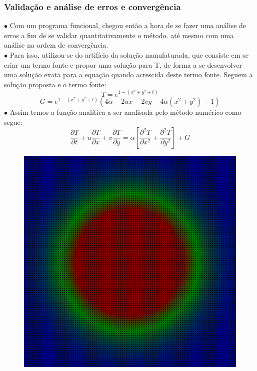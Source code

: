 \documentclass[xcolor=dvipsnames,10pt,aspectratio=169]{beamer}
\begin{document}
	\begin{frame}
		\frametitle{Validação e análise de erros e convergência}
		\begin{minipage}[h!]{0.77\textwidth}
			$\bullet$ Com um programa funcional, chegou então a hora de se fazer uma análise de erros a fim de se validar quantitativamente o método. até mesmo com uma análise na ordem de convergência.  \\
			$\bullet$ Para isso, utilizou-se do artifício da solução manufaturada, que consiste em se criar um termo fonte e propor uma solução para T, de forma a se desenvolver uma solução exata para a equação quando acrescida deste termo fonte. Seguem a solução proposta e o termo fonte:
			\begin{equation}
				T = e ^{1 - (x^2 + y^2 + t)}
			\end{equation}
			\begin{equation}
				G = e^{1 - (x^2 + y^2 + t)} \left( 4 \alpha - 2 u x - 2 v y - 4 \alpha (x^2 + y^2) - 1 \right)
			\end{equation}
			$\bullet$ Assim temos a função analítica a ser analisada pelo método numérico como segue:
			\begin{equation}
				\frac{\partial T}{\partial t} + u \frac{\partial T}{\partial x} + v \frac{\partial T}{\partial y} = \alpha \left[  \frac{\partial^2 T}{\partial x^2} + \frac{\partial^2 T}{\partial y^2}   \right] + G 
			\end{equation}
		\end{minipage}
		\begin{minipage}[h!]{0.17\textwidth}
			\begin{figure}[h!]
				\centering
				\includegraphics[trim = {0cm 0cm 0cm 0cm}, clip , angle=0, scale=0.1]{images/Analise_manufaturada}

\end{figure}
\end{minipage}
\end{frame}
\end{document}
